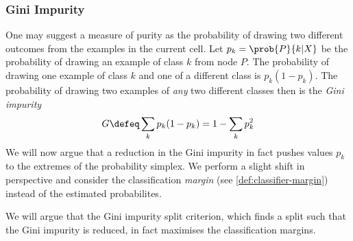 \documentclass[../main.tex]{subfiles}
\begin{document}
\subsubsection{Gini Impurity}
\label{sec:gini-impurity}



One may suggest a measure of purity as the probability of drawing two different outcomes from the examples in the current cell. 
Let $p_{k} = \prob{P}{k|X}$ be the probability of drawing an example of class $k$ from node $P$.
The probability of drawing one example of class $k$ and one of a different class is $p_{k}(1-p_{k})$.
The probability of drawing two examples of \textit{any} two different classes then is the \textit{Gini impurity}
$$
G \defeq \sum_{k}p_{k}(1-p_{k}) = 1 - \sum_k p_k^2
$$
We will now argue that a reduction in the Gini impurity in fact pushes values $p_{k}$ to the extremes of the probability simplex. 
We perform a slight shift in perspective and consider the classification \textit{margin} (see \ref{def:classifier-margin}) instead of the estimated probabilites. 



We will argue that the Gini impurity split criterion, which finds a split such that the Gini impurity is reduced, in fact maximises the classification margins.
\end{document}
